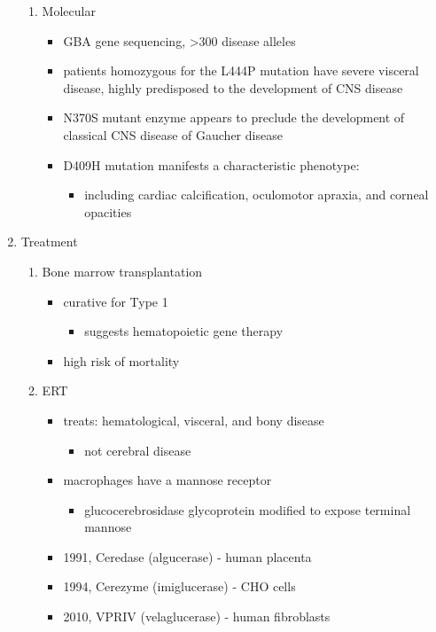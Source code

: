 \documentclass{scrartcl}
\begin{document}
\begin{enumerate}
\begin{enumerate}
\item Molecular
\label{sec:org188d1df}
\begin{itemize}
\item GBA gene sequencing, >300 disease alleles
\item patients homozygous for the L444P mutation have severe visceral
disease, highly predisposed to the development of CNS disease
\item N370S mutant enzyme appears to preclude the development of classical CNS disease of Gaucher disease
\item D409H mutation manifests a characteristic phenotype:
\begin{itemize}
\item including cardiac calcification, oculomotor apraxia, and corneal opacities
\end{itemize}
\end{itemize}
\end{enumerate}

\item Treatment
\label{sec:org1526729}
\begin{enumerate}
\item Bone marrow transplantation
\label{sec:org3dd9634}
\begin{itemize}
\item curative for Type 1
\begin{itemize}
\item suggests hematopoietic gene therapy
\end{itemize}
\item high risk of mortality
\end{itemize}
\item ERT
\label{sec:orga16ae6a}
\begin{itemize}
\item treats: hematological, visceral, and bony disease
\begin{itemize}
\item not cerebral disease
\end{itemize}
\item macrophages have a mannose receptor
\begin{itemize}
\item glucocerebrosidase glycoprotein modified to expose terminal mannose
\end{itemize}
\item 1991, Ceredase (algucerase) - human placenta
\item 1994, Cerezyme (imiglucerase) - CHO cells
\item 2010, VPRIV (velaglucerase) - human fibroblasts
\end{itemize}


\end{enumerate}
\end{enumerate}
\end{document}
